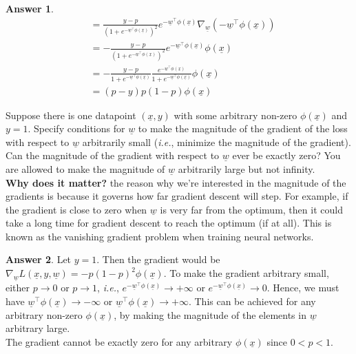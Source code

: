 \documentclass{article}
\renewcommand{\vec}[1]{\underline{#1}}
\newcommand{\vecw}{\vec{w}}
\theoremstyle{definition}
\newtheorem*{answer}{Answer}
\begin{document}
\begin{question}
\begin{question}
\begin{answer}
\begin{align*}
				&=\frac{y-p}{\left(1+e^{-\vecw^\top\phi(\underline{x})}\right)^2} e^{-\vecw^\top\phi(\underline{x})}\nabla_{\underline{w}}\left({-\vecw^\top\phi(\underline{x})} \right)\\
				&=-\frac{y-p}{\left(1+e^{-\vecw^\top\phi(\underline{x})}\right)^2} e^{-\vecw^\top\phi(\underline{x})}\phi(\underline{x})\\
				&=-\frac{y-p}{1+e^{-\vecw^\top\phi(\underline{x})}} \frac{e^{-\vecw^\top\phi(\underline{x})}}{1+e^{-\vecw^\top\phi(\underline{x})}}\phi(\underline{x})\\
				&=(p-y) p(1-p) \phi(\underline{x})
			\end{align*}
		\end{answer}
		\item Suppose there is one datapoint $(\underline{x},y)$ with some arbitrary non-zero $\phi(\underline{x})$ and $y=1$. Specify conditions for $\underline{w}$ to make the magnitude of the gradient of the loss with respect to $\underline{w}$ arbitrarily small (\textit{i.e.}, minimize the magnitude of the gradient). Can the magnitude of the gradient with respect to $\underline{w}$ ever be exactly zero? You are allowed to make the magnitude of $\underline{w}$ arbitrarily large but not infinity.\\
		
		\textbf{Why does it matter?} the reason why we're interested in the magnitude of the gradients is because it governs how far gradient descent will step. For example, if the gradient is close to zero when $\underline{w}$ is very far from the optimum, then it could take a long time for gradient descent to reach the optimum (if at all). This is known as the vanishing gradient problem when training neural networks.
		\begin{answer}
			Let $y=1$. Then the gradient would be $\nabla_{\underline{w}}L(\underline{x},y,\underline{w})= -p(1-p)^2 \phi(\underline{x})$. To make the gradient arbitrary small, either $p\rightarrow 0$ or $p\rightarrow 1$, \emph{i.e.}, $e^{-\vecw^\top\phi(\underline{x})} \rightarrow +\infty$ or $e^{-\vecw^\top\phi(\underline{x})} \rightarrow 0$. Hence, we must have $\vecw^\top\phi(\underline{x}) \rightarrow -\infty$ or $\vecw^\top\phi(\underline{x}) \rightarrow +\infty$. This can be achieved for any arbitrary non-zero $\phi(\underline{x})$, by making the magnitude of the elements  in $\vecw$ arbitrary large.\\
			
			The gradient cannot be exactly zero for any arbitrary $\phi(\underline{x})$ since $0<p<1$. 
		\end{answer}
	\end{question}
\end{question}
\end{document}
